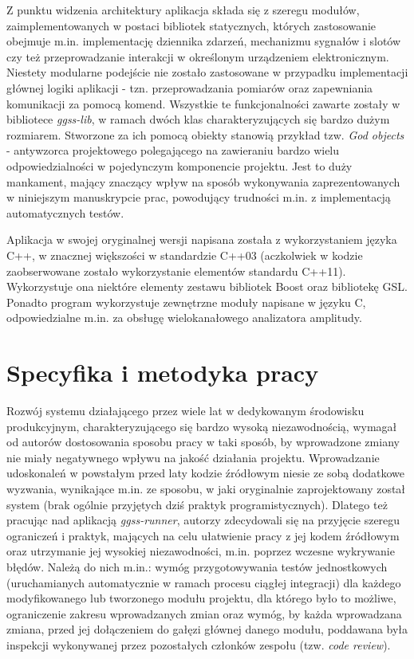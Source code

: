 Z punktu widzenia architektury aplikacja składa się z szeregu modułów, zaimplementowanych w postaci bibliotek statycznych, których zastosowanie obejmuje m.in. implementację dziennika zdarzeń, mechanizmu sygnałów i slotów czy też przeprowadzanie interakcji w określonym urządzeniem elektronicznym. Niestety modularne podejście nie zostało zastosowane w przypadku implementacji głównej logiki aplikacji - tzn. przeprowadzania pomiarów oraz zapewniania komunikacji za pomocą komend. Wszystkie te funkcjonalności zawarte zostały w bibliotece \emph{ggss-lib}, w ramach dwóch klas charakteryzujących się bardzo dużym rozmiarem. Stworzone za ich pomocą obiekty stanowią przykład tzw. \emph{God objects} - antywzorca projektowego polegającego na zawieraniu bardzo wielu odpowiedzialności w pojedynczym komponencie projektu. Jest to duży mankament, mający znaczący wpływ na sposób wykonywania zaprezentowanych w niniejszym manuskrypcie prac, powodujący trudności m.in. z implementacją automatycznych testów. 

Aplikacja w swojej oryginalnej wersji napisana została z wykorzystaniem języka C++, w znacznej większości w standardzie C++03 (aczkolwiek w kodzie zaobserwowane zostało wykorzystanie elementów standardu C++11). Wykorzystuje ona niektóre elementy zestawu bibliotek Boost oraz bibliotekę GSL. Ponadto program wykorzystuje zewnętrzne moduły napisane w języku C, odpowiedzialne m.in. za obsługę wielokanałowego analizatora amplitudy.

\clearpage
\section{Specyfika i metodyka pracy}
Rozwój systemu działającego przez wiele lat w dedykowanym środowisku produkcyjnym, charakteryzującego się bardzo wysoką niezawodnością, wymagał od autorów dostosowania sposobu pracy w taki sposób, by wprowadzone zmiany nie miały negatywnego wpływu na jakość działania projektu. Wprowadzanie udoskonaleń w powstałym przed laty kodzie źródłowym niesie ze sobą dodatkowe wyzwania, wynikające m.in. ze sposobu, w jaki oryginalnie zaprojektowany został system (brak ogólnie przyjętych dziś praktyk programistycznych). Dlatego też pracując nad aplikacją \emph{ggss-runner}, autorzy zdecydowali się na przyjęcie szeregu ograniczeń i praktyk, mających na celu ułatwienie pracy z jej kodem źródłowym oraz utrzymanie jej wysokiej niezawodności, m.in. poprzez wczesne wykrywanie błędów. Należą do nich m.in.: wymóg przygotowywania testów jednostkowych (uruchamianych automatycznie w ramach procesu ciągłej integracji) dla każdego modyfikowanego lub tworzonego modułu projektu, dla którego było to możliwe, ograniczenie zakresu wprowadzanych zmian oraz wymóg, by każda wprowadzana zmiana, przed jej dołączeniem do gałęzi głównej danego modułu, poddawana była inspekcji wykonywanej przez pozostałych członków zespołu (tzw. \emph{code review}).


